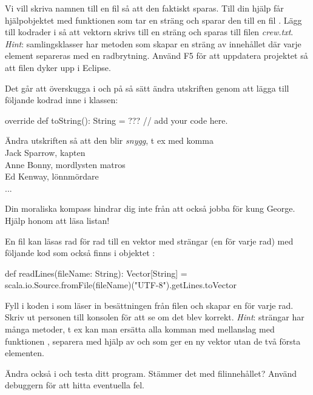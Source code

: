 \Subtask Vi vill skriva namnen till en fil så att den faktiskt sparas. Till din hjälp får hjälpobjektet  med funktionen  som tar en sträng  och sparar den till en fil . Lägg till kodrader i  så att vektorn skrivs till en sträng och sparas till filen \emph{crew.txt}. \emph{Hint}: samlingsklasser har metoden  som skapar en sträng av innehållet där varje element separeras med en radbrytning. Använd F5 för att uppdatera projektet så att filen dyker upp i Eclipse.



\Subtask Det går att överskugga  i  och på så sätt ändra utskriften genom att lägga till följande kodrad inne i klassen:
\begin{Code}
override def toString(): String = ??? // add your code here.
\end{Code}

\noindent Ändra utskriften så att den blir {\em snygg}, t ex med komma\\

\noindent Jack Sparrow, kapten \\
Anne Bonny, mordlysten matros \\
Ed Kenway, lönnmördare \\
...

{}

\Subtask Din moraliska kompass hindrar dig inte från att också jobba för kung George. Hjälp honom att läsa listan!

En fil  kan läsas rad för rad till en vektor med strängar (en för varje rad) med följande kod som också finns i objektet :

\begin{CodeSmall}
  def readLines(fileName: String): Vector[String] =
    scala.io.Source.fromFile(fileName)("UTF-8").getLines.toVector
\end{CodeSmall}


Fyll i koden i  som läser in besättningen från filen och skapar en  för varje rad. Skriv ut personen till konsolen för att se om det blev korrekt. \emph{Hint}: strängar har många metoder, t ex kan man ersätta alla komman med mellanslag med funktionen , separera med hjälp av  och  som ger en ny vektor utan de två första elementen.

\Subtask Ändra också i  och testa ditt program. Stämmer det med filinnehållet? Använd debuggern  för att hitta eventuella fel.

